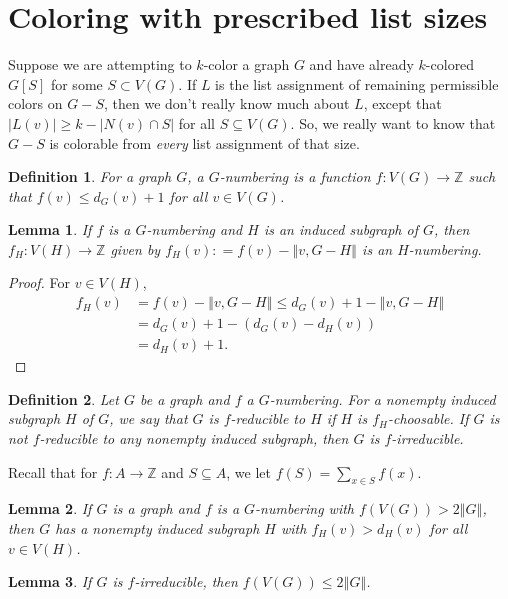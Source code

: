 \documentclass[openany]{tufte-book} %
\theoremstyle{plain}
\newtheorem{definition}{Definition}
\newtheorem{lemma}{Lemma}
\newcommand{\card}[1]{\left|#1\right|}
\newcommand{\size}[1]{\left\Vert#1\right\Vert}
\newcommand{\func}[3]{#1\colon #2 \rightarrow #3}
\newcommand{\DefinedAs}{\mathrel{\mathop:}=}
\newcommand{\IZ}{\mathbb{Z}}
\begin{document}
\section{Coloring with prescribed list sizes}
Suppose we are attempting to $k$-color a graph $G$ and have already $k$-colored $G[S]$ for some $S \subset V(G)$.  
If $L$ is the list assignment of remaining permissible colors on $G-S$, then we don't really know much about $L$, except that $\card{L(v)} \ge k - \card{N(v) \cap S}$ for all $S \subseteq V(G)$.
So, we really want to know that $G-S$ is colorable from \emph{every} list assignment of that size.

\begin{definition}
For a graph $G$, a \emph{$G$-numbering} is a function $\func{f}{V(G)}{\IZ}$ such that $f(v) \le d_G(v) + 1$ for all $v \in V(G)$.
\end{definition}

\begin{lemma}
If $f$ is a $G$-numbering and $H$ is an induced subgraph of $G$, then $\func{f_H}{V(H)}{\IZ}$ given by $f_H(v) \DefinedAs f(v) - \size{v, G-H}$ is an $H$-numbering.
\end{lemma}
\begin{proof}
For $v \in V(H)$,
\begin{align*}
f_H(v) &= f(v) - \size{v, G-H} \le d_G(v) + 1 - \size{v, G-H}\\
&= d_G(v) + 1 - (d_G(v) - d_H(v)) \\
&= d_H(v) + 1.
\end{align*}
\end{proof}

\begin{definition}
Let $G$ be a graph and $f$ a $G$-numbering. For a nonempty induced subgraph $H$ of $G$, we say that \emph{$G$ is $f$-reducible to $H$} if $H$ is $f_H$-choosable.  If $G$
is not $f$-reducible to any nonempty induced subgraph, then $G$ is $f$-irreducible.
\end{definition}

Recall that for $\func{f}{A}{\IZ}$ and $S \subseteq A$, we let $f(S) = \sum_{x \in S} f(x)$.
\begin{lemma}
If $G$ is a graph and $f$ is a $G$-numbering with $f(V(G)) > 2\size{G}$, then $G$ has a nonempty induced subgraph $H$ with $f_H(v) > d_H(v)$ for all $v \in V(H)$.
\end{lemma}
\begin{lemma}\label{BasicIrreducible}
If $G$ is $f$-irreducible, then $f(V(G)) \le 2\size{G}$.
\end{lemma}
\end{document}
